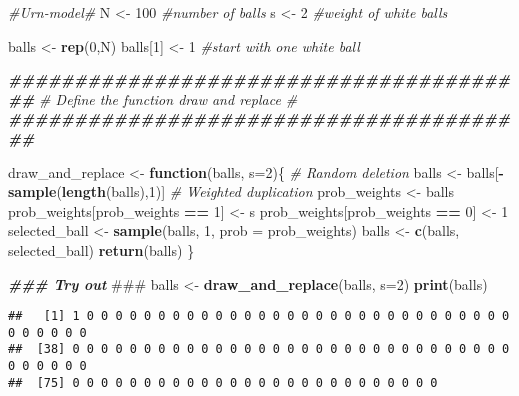 \documentclass[
]{article}
\newenvironment{Shaded}{\begin{snugshade}}{\end{snugshade}}
\newcommand{\AlertTok}[1]{\textcolor[rgb]{0.94,0.16,0.16}{#1}}
\newcommand{\AttributeTok}[1]{\textcolor[rgb]{0.13,0.29,0.53}{#1}}
\newcommand{\CommentTok}[1]{\textcolor[rgb]{0.56,0.35,0.01}{\textit{#1}}}
\newcommand{\ControlFlowTok}[1]{\textcolor[rgb]{0.13,0.29,0.53}{\textbf{#1}}}
\newcommand{\DecValTok}[1]{\textcolor[rgb]{0.00,0.00,0.81}{#1}}
\newcommand{\DocumentationTok}[1]{\textcolor[rgb]{0.56,0.35,0.01}{\textbf{\textit{#1}}}}
\newcommand{\FunctionTok}[1]{\textcolor[rgb]{0.13,0.29,0.53}{\textbf{#1}}}
\newcommand{\NormalTok}[1]{#1}
\newcommand{\OtherTok}[1]{\textcolor[rgb]{0.56,0.35,0.01}{#1}}
\newcommand{\SpecialCharTok}[1]{\textcolor[rgb]{0.81,0.36,0.00}{\textbf{#1}}}
\begin{document}
\begin{Shaded}
\begin{Highlighting}[]
\CommentTok{\#Urn{-}model\#}
\NormalTok{N }\OtherTok{\textless{}{-}} \DecValTok{100} \CommentTok{\#number of balls}
\NormalTok{s }\OtherTok{\textless{}{-}} \DecValTok{2} \CommentTok{\#weight of white balls}

\NormalTok{balls }\OtherTok{\textless{}{-}} \FunctionTok{rep}\NormalTok{(}\DecValTok{0}\NormalTok{,N)}
\NormalTok{balls[}\DecValTok{1}\NormalTok{] }\OtherTok{\textless{}{-}} \DecValTok{1} \CommentTok{\#start with one white ball}

\DocumentationTok{\#\#\#\#\#\#\#\#\#\#\#\#\#\#\#\#\#\#\#\#\#\#\#\#\#\#\#\#\#\#\#\#\#\#\#\#\#\#\#\#}
\CommentTok{\# Define the function draw and replace \#}
\DocumentationTok{\#\#\#\#\#\#\#\#\#\#\#\#\#\#\#\#\#\#\#\#\#\#\#\#\#\#\#\#\#\#\#\#\#\#\#\#\#\#\#\#}

\NormalTok{draw\_and\_replace }\OtherTok{\textless{}{-}} \ControlFlowTok{function}\NormalTok{(balls, }\AttributeTok{s=}\DecValTok{2}\NormalTok{)\{}
  \CommentTok{\# Random deletion}
\NormalTok{  balls }\OtherTok{\textless{}{-}}\NormalTok{ balls[}\SpecialCharTok{{-}}\FunctionTok{sample}\NormalTok{(}\FunctionTok{length}\NormalTok{(balls),}\DecValTok{1}\NormalTok{)]}
  \CommentTok{\# Weighted duplication}
\NormalTok{  prob\_weights }\OtherTok{\textless{}{-}}\NormalTok{ balls}
\NormalTok{  prob\_weights[prob\_weights }\SpecialCharTok{==} \DecValTok{1}\NormalTok{] }\OtherTok{\textless{}{-}}\NormalTok{ s}
\NormalTok{  prob\_weights[prob\_weights }\SpecialCharTok{==} \DecValTok{0}\NormalTok{] }\OtherTok{\textless{}{-}} \DecValTok{1}
\NormalTok{  selected\_ball }\OtherTok{\textless{}{-}} \FunctionTok{sample}\NormalTok{(balls, }\DecValTok{1}\NormalTok{, }\AttributeTok{prob =}\NormalTok{ prob\_weights)}
\NormalTok{  balls }\OtherTok{\textless{}{-}} \FunctionTok{c}\NormalTok{(balls, selected\_ball)}
  \FunctionTok{return}\NormalTok{(balls)}
\NormalTok{\}}

\DocumentationTok{\#\#\# Try out }\AlertTok{\#\#\#}
\NormalTok{balls }\OtherTok{\textless{}{-}} \FunctionTok{draw\_and\_replace}\NormalTok{(balls, }\AttributeTok{s=}\DecValTok{2}\NormalTok{)  }
\FunctionTok{print}\NormalTok{(balls)}
\end{Highlighting}
\end{Shaded}

\begin{verbatim}
##   [1] 1 0 0 0 0 0 0 0 0 0 0 0 0 0 0 0 0 0 0 0 0 0 0 0 0 0 0 0 0 0 0 0 0 0 0 0 0
##  [38] 0 0 0 0 0 0 0 0 0 0 0 0 0 0 0 0 0 0 0 0 0 0 0 0 0 0 0 0 0 0 0 0 0 0 0 0 0
##  [75] 0 0 0 0 0 0 0 0 0 0 0 0 0 0 0 0 0 0 0 0 0 0 0 0 0 0
\end{verbatim}
\end{document}
